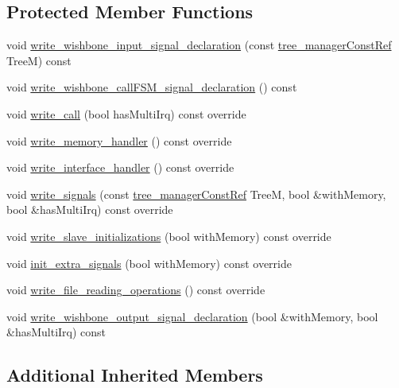 \subsection*{Protected Member Functions}
\begin{DoxyCompactItemize}
\item 
void \hyperlink{classWishboneInterfaceTestbench_adc1417a0e4510edbb2235bad38f5741d}{write\+\_\+wishbone\+\_\+input\+\_\+signal\+\_\+declaration} (const \hyperlink{tree__manager_8hpp_a792e3f1f892d7d997a8d8a4a12e39346}{tree\+\_\+manager\+Const\+Ref} TreeM) const
\item 
void \hyperlink{classWishboneInterfaceTestbench_ac178e39ecf9b0c3a17d65dcb7e07ba60}{write\+\_\+wishbone\+\_\+call\+F\+S\+M\+\_\+signal\+\_\+declaration} () const
\item 
void \hyperlink{classWishboneInterfaceTestbench_a6e234d950e3b63e52ab206e23b68531e}{write\+\_\+call} (bool has\+Multi\+Irq) const override
\item 
void \hyperlink{classWishboneInterfaceTestbench_aa94678609b7c8f3c402a0642776f9fda}{write\+\_\+memory\+\_\+handler} () const override
\item 
void \hyperlink{classWishboneInterfaceTestbench_a8a656572943eb09c0da774d124ab7a05}{write\+\_\+interface\+\_\+handler} () const override
\item 
void \hyperlink{classWishboneInterfaceTestbench_af319e1ea1cb928d2d4ce67815622b62e}{write\+\_\+signals} (const \hyperlink{tree__manager_8hpp_a792e3f1f892d7d997a8d8a4a12e39346}{tree\+\_\+manager\+Const\+Ref} TreeM, bool \&with\+Memory, bool \&has\+Multi\+Irq) const override
\item 
void \hyperlink{classWishboneInterfaceTestbench_ae87e0398c62bdaa30f68d492a07e7cdc}{write\+\_\+slave\+\_\+initializations} (bool with\+Memory) const override
\item 
void \hyperlink{classWishboneInterfaceTestbench_ab6123ce32d28cf46681575d10c293158}{init\+\_\+extra\+\_\+signals} (bool with\+Memory) const override
\item 
void \hyperlink{classWishboneInterfaceTestbench_a0ceb1c7cca0f25da26b7eff3797489bf}{write\+\_\+file\+\_\+reading\+\_\+operations} () const override
\item 
void \hyperlink{classWishboneInterfaceTestbench_ab0f2a4e30aad0f4854e902054d1a6114}{write\+\_\+wishbone\+\_\+output\+\_\+signal\+\_\+declaration} (bool \&with\+Memory, bool \&has\+Multi\+Irq) const
\end{DoxyCompactItemize}
\subsection*{Additional Inherited Members}



